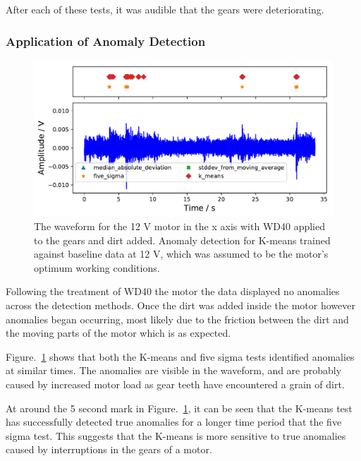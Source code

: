 After each of these tests, it was audible that the gears were deteriorating. 


\subsubsection{Application of Anomaly Detection}

\begin{figure}[t]
    \includegraphics[width=1.0\textwidth]{fig/WD40_dry_dirt_12V_motornorm12V.pdf}
    \caption[Anomaly Tests 12 V Motor with Dirt]{The waveform for the 12 V motor in the x axis with WD40 applied to the gears and dirt added. Anomaly detection for K-means trained against baseline data at 12 V, which was assumed to be the motor's optimum working conditions.}
    \label{fig:12V_dirt}
\end{figure}

Following the treatment of WD40 the motor the data displayed no anomalies across the detection methods. Once the dirt was added inside the motor however anomalies began occurring, most likely due to the friction between the dirt and the moving parts of the motor which is as expected.

Figure.~\ref{fig:12V_dirt} shows that both the K-means and five sigma tests identified anomalies at similar times. The anomalies are visible in the waveform, and are probably caused by increased motor load as gear teeth have encountered a grain of dirt. 

At around the 5 second mark in Figure.~\ref{fig:12V_dirt}, it can be seen that the K-means test has successfully detected true anomalies for a longer time period that the five sigma test. This suggests that the K-means is more sensitive to true anomalies caused by interruptions in the gears of a motor.


